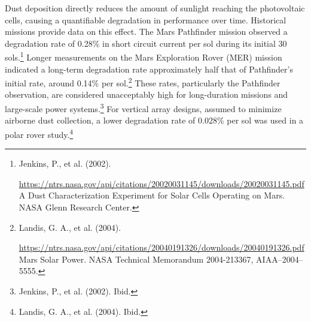 \documentclass[fontsize=10pt, oneside, DIV=calc]{scrartcl}
\begin{document}
\medskip

\noindent
Dust deposition directly reduces the amount of sunlight reaching the photovoltaic cells, causing a quantifiable degradation in performance over time. Historical missions provide data on this effect. The Mars Pathfinder mission observed a degradation rate of 0.28\% in short circuit current per sol during its initial 30 sols.\footnote{Jenkins, P., et al. (2002). 







\href{https://ntrs.nasa.gov/api/citations/20020031145/downloads/20020031145.pdf}\url{https://ntrs.nasa.gov/api/citations/20020031145/downloads/20020031145.pdf} A Dust Characterization Experiment for Solar Cells Operating on Mars. NASA Glenn Research Center.} Longer measurements on the Mars Exploration Rover (MER) mission indicated a long-term degradation rate approximately half that of Pathfinder's initial rate, around 0.14\% per sol.\footnote{Landis, G. A., et al. (2004). 







\href{https://ntrs.nasa.gov/api/citations/20040191326/downloads/20040191326.pdf}\url{https://ntrs.nasa.gov/api/citations/20040191326/downloads/20040191326.pdf} Mars Solar Power. NASA Technical Memorandum 2004-213367, AIAA–2004–5555.} These rates, particularly the Pathfinder observation, are considered unacceptably high for long-duration missions and large-scale power systems.\footnote{Jenkins, P., et al. (2002). Ibid.} For vertical array designs, assumed to minimize airborne dust collection, a lower degradation rate of 0.028\% per sol was used in a polar rover study.\footnote{Landis, G. A., et al. (2004). Ibid.}

\medskip
\end{document}

